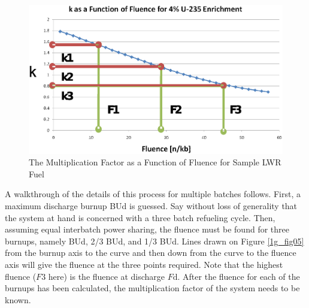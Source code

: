 \begin{figure}[htbp]
\caption{The Multiplication Factor as a Function of Fluence for Sample LWR Fuel}
\label{1g_fig06}
\begin{center}
\includegraphics[scale=0.5]{one_group_method/figs/Fig06.eps}
\end{center}
\end{figure}

A walkthrough of the details of this process for multiple batches follows.  First, a maximum 
discharge burnup BUd is guessed.  Say without loss of generality that the system at hand is 
concerned with a three batch refueling cycle.  Then, assuming equal interbatch power sharing, 
the fluence must be found for three burnups, namely BUd, 2/3 BUd, and 1/3 BUd.   Lines drawn on 
Figure \ref{1g_fig05} from the burnup axis to the curve and then down from the curve to the fluence 
axis will give the fluence at the three points required.  Note that the highest fluence ($F3$ here) 
is the fluence at discharge $F\mbox{d}$.  After the fluence for each of the burnups has been calculated, 
the multiplication factor of the system needs to be known. 

